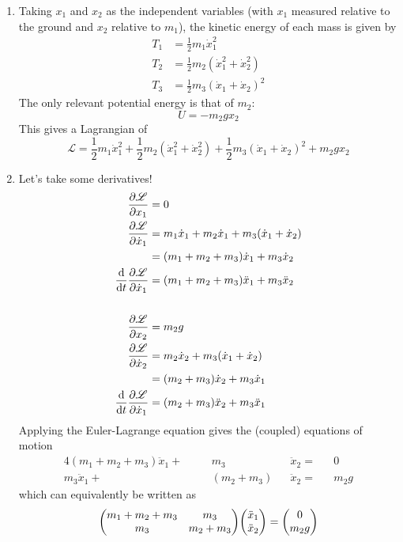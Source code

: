 \documentclass[12pt]{article}
\begin{document}
\begin{enumerate}[label=(\alph*)]
    \item Taking $x_1$ and $x_2$ as the independent variables (with $x_1$ measured relative to the ground and $x_2$ relative to $m_1$), the kinetic energy of each mass is given by
    \begin{align*}
        T_1 &= \frac{1}{2}m_1\dot{x}_1^2 \\
        T_2 &= \frac{1}{2}m_2(\dot{x}_1^2 + \dot{x}_2^2) \\
        T_3 &= \frac{1}{2}m_3(\dot{x}_1 + \dot{x}_2)^2
    \end{align*}
    The only relevant potential energy is that of $m_2$:
    \[ U = -m_2gx_2 \]
    This gives a Lagrangian of
    \[ \boxed{\mathscr{L} = \frac{1}{2}m_1\dot{x}_1^2 + \frac{1}{2}m_2(\dot{x}_1^2 + \dot{x}_2^2) + \frac{1}{2}m_3(\dot{x}_1 + \dot{x}_2)^2 + m_2gx_2} \]
    \item Let's take some derivatives!
    \begin{align*}
        \pdv{\mathscr{L}}{x_1} &= 0 \\
        \pdv{\mathscr{L}}{\dot{x}_1} &= m_1\dot{x}_1 + m_2\dot{x}_1 + m_3(\dot{x}_1 + \dot{x}_2) \\
        &= (m_1+m_2+m_3)\dot{x}_1 + m_3\dot{x}_2 \\
        \dv{t}\pdv{\mathscr{L}}{\dot{x}_1} &= (m_1+m_2+m_3)\ddot{x}_1 + m_3\ddot{x}_2 \\
        \\
        \pdv{\mathscr{L}}{x_2} &= m_2g \\
        \pdv{\mathscr{L}}{\dot{x}_2} &= m_2\dot{x}_2 + m_3(\dot{x}_1 + \dot{x}_2)  \\
        &= (m_2+m_3)\dot{x}_2 + m_3\dot{x}_1 \\
        \dv{t}\pdv{\mathscr{L}}{\dot{x}_1} &= (m_2+m_3)\ddot{x}_2 + m_3\ddot{x}_1 \\
    \end{align*}
    Applying the Euler-Lagrange equation gives the (coupled) equations of motion
    \begin{alignat*}{4}
        (m_1+m_2+m_3)\ddot{x}_1+&&\quad m_3&&\ddot{x}_2 =&& 0 \\
        m_3\ddot{x}_1+&&\quad (m_2+m_3)&&\ddot{x}_2 =&& m_2g
    \end{alignat*}
    which can equivalently be written as
    \[ \mqty(m_1+m_2+m_3 & m_3 \\ m_3 & m_2+m_3)\mqty(\ddot{x}_1 \\ \ddot{x}_2) = \mqty(0 \\ m_2g) \]

\end{enumerate}
\end{document}

